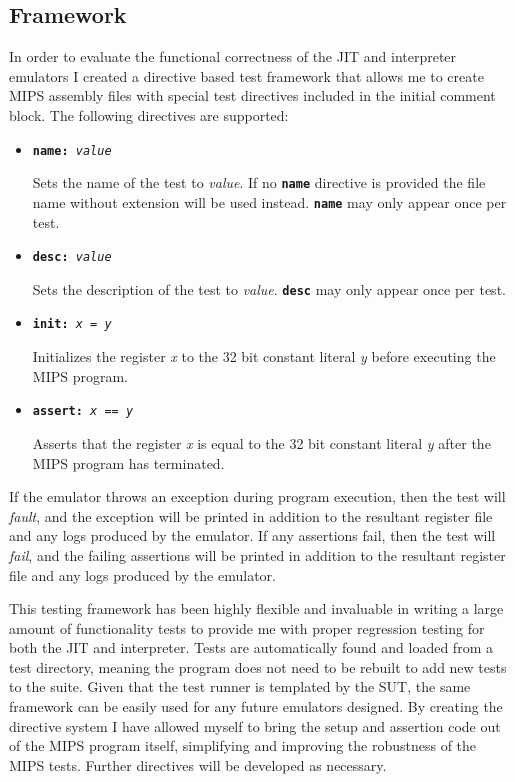 \subsection{Framework}

In order to evaluate the functional correctness of the JIT and interpreter emulators I created a directive based test framework that allows me to create MIPS assembly files with special test directives included in the initial comment block. The following directives are supported:

\begin{itemize}
    \item \texttt{\textbf{name:} \textit{value}}
    
    Sets the name of the test to \textit{value}. If no \texttt{\textbf{name}} directive is provided the file name without extension will be used instead. \texttt{\textbf{name}} may only appear once per test.

    \item \texttt{\textbf{desc:} \textit{value}}
    
    Sets the description of the test to \textit{value}. \texttt{\textbf{desc}} may only appear once per test.

    \item \texttt{\textbf{init:} \textit{x} = \textit{y}}
    
    Initializes the register \textit{x} to the 32 bit constant literal \textit{y} before executing the MIPS program.

    \item \texttt{\textbf{assert:} \textit{x} == \textit{y}}
    
    Asserts that the register \textit{x} is equal to the 32 bit constant literal \textit{y} after the MIPS program has terminated.
\end{itemize}

If the emulator throws an exception during program execution, then the test will \emph{fault}, and the exception will be printed in addition to the resultant register file and any logs produced by the emulator. If any assertions fail, then the test will \emph{fail}, and the failing assertions will be printed in addition to the resultant register file and any logs produced by the emulator.

This testing framework has been highly flexible and invaluable in writing a large amount of functionality tests to provide me with proper regression testing for both the JIT and interpreter. Tests are automatically found and loaded from a test directory, meaning the program does not need to be rebuilt to add new tests to the suite. Given that the test runner is templated by the SUT, the same framework can be easily used for any future emulators designed. By creating the directive system I have allowed myself to bring the setup and assertion code out of the MIPS program itself, simplifying and improving the robustness of the MIPS tests. Further directives will be developed as necessary.

